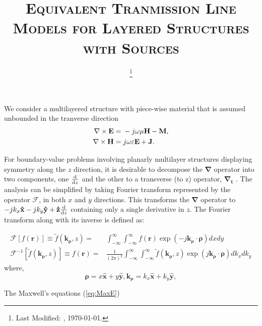\documentclass[11pt]{article}
\begin{document}
  \title{\textsc{Equivalent Tranmission Line Models for Layered Structures with Sources}\\}
  \date{\footnote{Last Modified: \currenttime, \today.}}
  \maketitle
 We consider a multilayered structure with piece-wise material that is assumed unbounded in the tranverse direction
  \begin{subequations}
    \begin{align}
      \nabla\times{\bf E} ={}& -j \omega \mu \bf{H} -\bf{M},
  		\label{eq:E}\\
      \nabla\times{\bf H} ={}& j \omega \varepsilon \bf{E} + \bf{J}.
  		\label{eq:H}
    \end{align}
    \label{eq:MaxE}
  \end{subequations}

For boundary-value problems involving planarly multilayer structures displaying symmetry along the $z$ direction, it is desirable to decompose the $\mathbf{\nabla}$ operator into two components, one $\dv{}{z}$ and the other to a transverse (to z) operator, $\mathbf{\nabla_t}$ \cite[p. 64]{felsen1994radiation}. The analysis can be simplified by taking Fourier transform represented by the operator $\mathcal{F}$, in both $x$ and $y$ directions. This transforms the $\mathbf{\nabla}$ operator to $-j k_x \mathbf{\hat{x}} - j k_y \mathbf{\hat{y}} + \mathbf{\hat{z}}\dv{}{z}$ containing only a single derivative in $z$.
The Fourier transform along with its inverse is defined as:

\begin{subequations}
  \begin{align}
    \mathcal{F}[f(\mathbf{r})] \equiv \tilde{f}(\mathbf{k_{\rho}},z) ={}& \int_{-\infty}^{\infty} \int_{-\infty}^{\infty}
    f(\mathbf{r}) \exp(-j \mathbf{k_{\rho}} \cdot \mathbf{\rho}) dx dy
    \label{eq:Fourier}\\
    \mathcal{F}^{-1}[\tilde{f}(\mathbf{k_{\rho}},z)] \equiv f(\mathbf{r}) ={}& \frac{1}{(2\pi)^2} \int_{-\infty}^{\infty} \int_{-\infty}^{\infty} \tilde{f}(\mathbf{k_{\rho}},z)
    \exp(j \mathbf{k_{\rho}} \cdot \mathbf{\rho}) dk_x dk_y
    \label{eq:IFourier}
  \end{align}
  \label{eq:FT}
\end{subequations}
 where,
 \begin{equation}
   \mathbf{\rho} = x\mathbf{\hat{x}} + y\mathbf{\hat{y}},
   \mathbf{k_{\rho}} = k_x\mathbf{\hat{x}} + k_y\mathbf{\hat{y}},
 \end{equation}

The Maxwell's equations (\ref{eq:MaxE})




\end{document}
